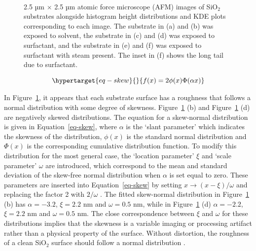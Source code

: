 \documentclass[
  a4paper,
]{scrbook}
\begin{document}
\begin{figure}
\begin{minipage}[t]{0.45\linewidth}
{{}

}

\end{minipage}%
%
\begin{minipage}[t]{0.01\linewidth}

{\centering 

~

}

\end{minipage}%

\caption{\label{fig-afm-substrate}2.5 µm \(\times\) 2.5 µm atomic force
microscope (AFM) images of SiO\(_2\) substrates alongside histogram
height distributions and KDE plots corresponding to each image. The
substrate in (a) and (b) was exposed to solvent, the substrate in (c)
and (d) was exposed to surfactant, and the substrate in (e) and (f) was
exposed to surfactant with steam present. The inset in (f) shows the
long tail due to surfactant.}

\end{figure}

\begin{equation}\protect\hypertarget{eq-skew}{}{
f(x) = 2\phi(x)\Phi(\alpha x)
}\label{eq-skew}\end{equation}

In Figure~\ref{fig-afm-substrate}, it appears that each substrate
surface has a roughness that follows a normal distribution with some
degree of skewness. Figure~\ref{fig-afm-substrate} (b) and
Figure~\ref{fig-afm-substrate} (d) are negatively skewed distributions.
The equation for a skew-normal distribution is given in
Equation~\ref{eq-skew}, where \(\alpha\) is the `slant parameter' which
indicates the skewness of the distribution, \(\phi(x)\) is the standard
normal distribution and \(\Phi(x)\) is the corresponding cumulative
distribution function. To modify this distribution for the most general
case, the `location parameter' \(\xi\) and `scale parameter' \(\omega\)
are introduced, which correspond to the mean and standard deviation of
the skew-free normal distribution when \(\alpha\) is set equal to zero.
These parameters are inserted into Equation~\ref{eq-skew} by setting
\(x \rightarrow (x-\xi)/\omega\) and replacing the factor 2 with
\(2/\omega\) \autocite{Azzalini2013}. The fitted skew-normal
distribution in Figure~\ref{fig-afm-substrate} (b) has
\(\alpha = -3.2\), \(\xi = 2.2\) nm and \(\omega = 0.5\) nm, while in
Figure~\ref{fig-afm-substrate} (d) \(\alpha = -2.2\), \(\xi = 2.2\) nm
and \(\omega = 0.5\) nm. The close correspondence between \(\xi\) and
\(\omega\) for these distributions implies that the skewness is a
variable imaging or processing artifact rather than a physical property
of the surface. Without distortion, the roughness of a clean SiO\(_2\)
surface should follow a normal distribution \autocite{Velicky2015}.
\end{document}

